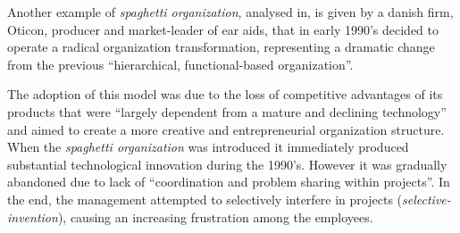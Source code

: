 Another example of \textit{spaghetti organization}, analysed in\cite{5}, is given by a danish firm, Oticon, producer and market-leader of ear aids, that in early 1990’s decided to operate a radical organization transformation, representing a dramatic change from the previous ``hierarchical, functional-based organization''.

The adoption of this model was due to the loss of competitive advantages of its products that were ``largely dependent from a mature and declining technology'' and aimed to create a more creative and entrepreneurial organization structure. When the \textit{spaghetti organization} was introduced it immediately produced substantial technological innovation during the 1990’s.
However it was gradually abandoned due to lack of ``coordination and problem sharing within projects''. In the end, the management attempted to selectively interfere in projects (\textit{selective-invention}), causing an increasing frustration among the employees.
